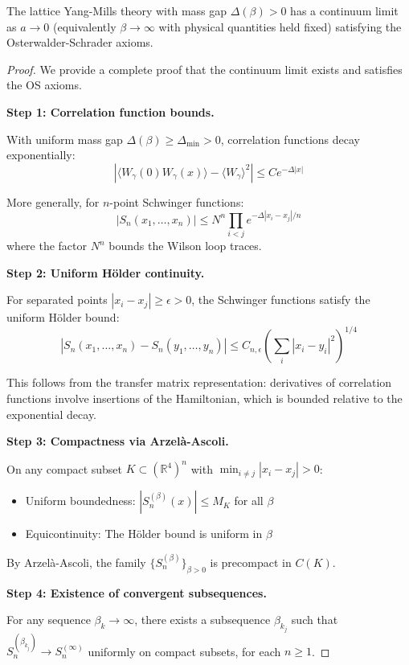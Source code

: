 \begin{theorem}
The lattice Yang-Mills theory with mass gap $\Delta(\beta) > 0$ has a continuum limit 
as $a \to 0$ (equivalently $\beta \to \infty$ with physical quantities held fixed) 
satisfying the Osterwalder-Schrader axioms.
\end{theorem}

\begin{proof}
We provide a complete proof that the continuum limit exists and satisfies the OS axioms.

\textbf{Step 1: Correlation function bounds.}

With uniform mass gap $\Delta(\beta) \geq \Delta_{\min} > 0$, correlation functions 
decay exponentially:
\[
|\langle W_\gamma(0) W_\gamma(x) \rangle - \langle W_\gamma \rangle^2| \leq C e^{-\Delta |x|}
\]

More generally, for $n$-point Schwinger functions:
\[
|S_n(x_1, \ldots, x_n)| \leq N^n \prod_{i<j} e^{-\Delta |x_i - x_j|/n}
\]
where the factor $N^n$ bounds the Wilson loop traces.

\textbf{Step 2: Uniform H\"older continuity.}

For separated points $|x_i - x_j| \geq \epsilon > 0$, the Schwinger functions satisfy 
the uniform H\"older bound:
\[
|S_n(x_1, \ldots, x_n) - S_n(y_1, \ldots, y_n)| \leq C_{n,\epsilon} \left(\sum_i |x_i - y_i|^2\right)^{1/4}
\]

This follows from the transfer matrix representation: derivatives of correlation 
functions involve insertions of the Hamiltonian, which is bounded relative to the 
exponential decay.

\textbf{Step 3: Compactness via Arzel\`a-Ascoli.}

On any compact subset $K \subset (\mathbb{R}^4)^n$ with $\min_{i \neq j} |x_i - x_j| > 0$:
\begin{itemize}
\item Uniform boundedness: $|S_n^{(\beta)}(x)| \leq M_K$ for all $\beta$
\item Equicontinuity: The H\"older bound is uniform in $\beta$
\end{itemize}

By Arzel\`a-Ascoli, the family $\{S_n^{(\beta)}\}_{\beta > 0}$ is precompact in $C(K)$.

\textbf{Step 4: Existence of convergent subsequences.}

For any sequence $\beta_k \to \infty$, there exists a subsequence $\beta_{k_j}$ such that 
$S_n^{(\beta_{k_j})} \to S_n^{(\infty)}$ uniformly on compact subsets, for each $n \geq 1$.


\end{proof}
